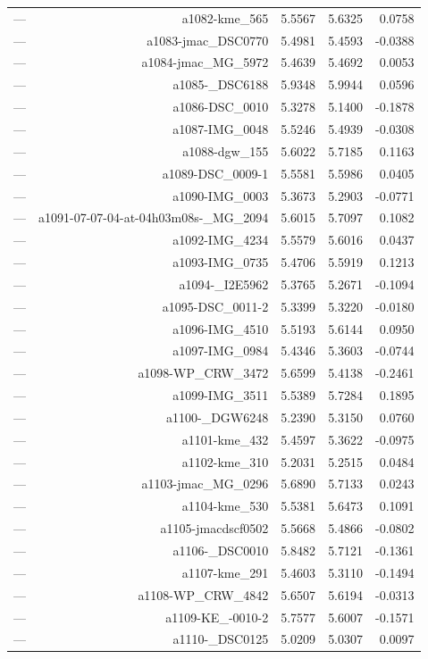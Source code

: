 \begin{table}[htbp]
\begin{tabular}{lrrrr}
— & a1082-kme_565 & 5.5567 & 5.6325 & 0.0758 \\
— & a1083-jmac_DSC0770 & 5.4981 & 5.4593 & -0.0388 \\
— & a1084-jmac_MG_5972 & 5.4639 & 5.4692 & 0.0053 \\
— & a1085-_DSC6188 & 5.9348 & 5.9944 & 0.0596 \\
— & a1086-DSC_0010 & 5.3278 & 5.1400 & -0.1878 \\
— & a1087-IMG_0048 & 5.5246 & 5.4939 & -0.0308 \\
— & a1088-dgw_155 & 5.6022 & 5.7185 & 0.1163 \\
— & a1089-DSC_0009-1 & 5.5581 & 5.5986 & 0.0405 \\
— & a1090-IMG_0003 & 5.3673 & 5.2903 & -0.0771 \\
— & a1091-07-07-04-at-04h03m08s-_MG_2094 & 5.6015 & 5.7097 & 0.1082 \\
— & a1092-IMG_4234 & 5.5579 & 5.6016 & 0.0437 \\
— & a1093-IMG_0735 & 5.4706 & 5.5919 & 0.1213 \\
— & a1094-_I2E5962 & 5.3765 & 5.2671 & -0.1094 \\
— & a1095-DSC_0011-2 & 5.3399 & 5.3220 & -0.0180 \\
— & a1096-IMG_4510 & 5.5193 & 5.6144 & 0.0950 \\
— & a1097-IMG_0984 & 5.4346 & 5.3603 & -0.0744 \\
— & a1098-WP_CRW_3472 & 5.6599 & 5.4138 & -0.2461 \\
— & a1099-IMG_3511 & 5.5389 & 5.7284 & 0.1895 \\
— & a1100-_DGW6248 & 5.2390 & 5.3150 & 0.0760 \\
— & a1101-kme_432 & 5.4597 & 5.3622 & -0.0975 \\
— & a1102-kme_310 & 5.2031 & 5.2515 & 0.0484 \\
— & a1103-jmac_MG_0296 & 5.6890 & 5.7133 & 0.0243 \\
— & a1104-kme_530 & 5.5381 & 5.6473 & 0.1091 \\
— & a1105-jmacdscf0502 & 5.5668 & 5.4866 & -0.0802 \\
— & a1106-_DSC0010 & 5.8482 & 5.7121 & -0.1361 \\
— & a1107-kme_291 & 5.4603 & 5.3110 & -0.1494 \\
— & a1108-WP_CRW_4842 & 5.6507 & 5.6194 & -0.0313 \\
— & a1109-KE_-0010-2 & 5.7577 & 5.6007 & -0.1571 \\
— & a1110-_DSC0125 & 5.0209 & 5.0307 & 0.0097 \\

\end{tabular}
\end{table}

